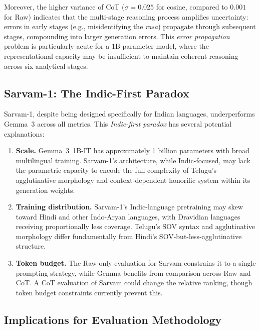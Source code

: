\documentclass[11pt]{article}
\begin{document}
Moreover, the higher variance of CoT ($\sigma = 0.025$ for cosine, compared to $0.001$ for Raw) indicates that the multi-stage reasoning process amplifies uncertainty: errors in early stages (e.g., misidentifying the \textit{rasa}) propagate through subsequent stages, compounding into larger generation errors. This \textit{error propagation} problem is particularly acute for a 1B-parameter model, where the representational capacity may be insufficient to maintain coherent reasoning across six analytical stages.

\subsection{Sarvam-1: The Indic-First Paradox}
\label{subsec:sarvam-paradox}

Sarvam-1, despite being designed specifically for Indian languages, underperforms Gemma~3 across all metrics. This \textit{Indic-first paradox} has several potential explanations:

\begin{enumerate}[leftmargin=*,itemsep=1pt]
    \item \textbf{Scale.} Gemma~3~1B-IT has approximately 1 billion parameters with broad multilingual training. Sarvam-1's architecture, while Indic-focused, may lack the parametric capacity to encode the full complexity of Telugu's agglutinative morphology and context-dependent honorific system within its generation weights.
    
    \item \textbf{Training distribution.} Sarvam-1's Indic-language pretraining may skew toward Hindi and other Indo-Aryan languages, with Dravidian languages receiving proportionally less coverage. Telugu's SOV syntax and agglutinative morphology differ fundamentally from Hindi's SOV-but-less-agglutinative structure.
    
    \item \textbf{Token budget.} The Raw-only evaluation for Sarvam constrains it to a single prompting strategy, while Gemma benefits from comparison across Raw and CoT. A CoT evaluation of Sarvam could change the relative ranking, though token budget constraints currently prevent this.
\end{enumerate}

\subsection{Implications for Evaluation Methodology}
\label{subsec:eval-implications}
\end{document}
